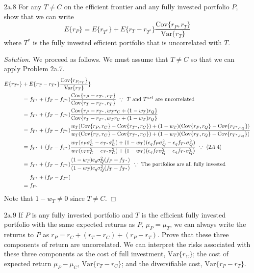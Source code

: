 \begin{problem}{2a.8}
For any $T \neq C$ on the efficient frontier and any fully invested portfolio $P$, show that we can write \[E\{r_{P}\} = E\{r_{T^{\ast}}\} + E\{r_{T} - r_{T^{\ast}}\}\frac{\mathrm{Cov}\{r_{P}, r_{T}\}}{\mathrm{Var}\{r_{T}\}}\] where $T^{\ast}$ is the fully invested efficient portfolio that is uncorrelated with $T$.
\end{problem}

\begin{proof}[Solution]
We proceed as follows. We must assume that $T \neq C$ so that we can apply Problem 2a.7.
\begin{align*}
E\{r_{T^{\ast}}\} &+ E\{r_{T} - r_{T^{\ast}}\}\frac{\mathrm{Cov}\{r_{P, r_{T}}\}}{\mathrm{Var}\{r_{T}\}}\}\\
&= f_{T^{\ast}} + (f_{T} - f_{T^{\ast}})\frac{\mathrm{Cov}\{r_{P} - r_{T^{\ast}}, r_{T}\}}{\mathrm{Cov}\{r_{T} - r_{T^{\ast}}, r_{T}\}} ~ \because ~ T \text{ and } T^{ast} \text{ are uncorrelated}\\
&= f_{T^{\ast}} + (f_{T} - f_{T^{\ast}})\frac{\mathrm{Cov}\{r_{P} - r_{T^{\ast}}, w_{T}r_{C} + (1 - w_{T})r_{Q}\}}{\mathrm{Cov}\{r_{T} - r_{T^{\ast}}, w_{T}r_{C} + (1 - w_{T})r_{Q}\}} \\
&= f_{T^{\ast}} + (f_{T} - f_{T^{\ast}})\frac{w_{T}(\mathrm{Cov}\{r_{P}, r_{C}\} - \mathrm{Cov}\{r_{T^{\ast}}, r_{C}\}) + (1 - w_{T})(\mathrm{Cov}\{r_{P}, r_{Q}\} - \mathrm{Cov}\{r_{T^{\ast}, r_{Q}}\})}{w_{T}(\mathrm{Cov}\{r_{T}, r_{C}\} - \mathrm{Cov}\{r_{T^{\ast}}, r_{C}\}) + (1 - w_{T})(\mathrm{Cov}\{r_{T}, r_{Q}\} - \mathrm{Cov}\{r_{T^{\ast}, r_{Q}}\})}\\
&= f_{T^{\ast}} + (f_{T} - f_{T^{\ast}})\frac{w_{T}(e_{P}\sigma_{C}^{2} - e_{T^{\ast}}\sigma_{C}^{2}) + (1 - w_{T})(e_{q}f_{P}\sigma_{Q}^{2} - e_{q}f_{T^{\ast}}\sigma_{Q}^{2})}{w_{T}(e_{T}\sigma_{C}^{2} - e_{T^{\ast}}\sigma_{C}^{2}) + (1 - w_{T})(e_{q}f_{T}\sigma_{Q}^{2} - e_{q}f_{T^{\ast}}\sigma_{Q}^{2})} ~ \because ~ (2A.4)\\
&= f_{T^{\ast}} + (f_{T} - f_{T^{\ast}})\frac{(1 - w_{T})e_{q}\sigma_{Q}^{2}(f_{P} - f_{T^{\ast}})}{(1 - w_{T})e_{q}\sigma_{Q}^{2}(f_{T} - f_{T^{\ast}})} ~ \because ~ \text{The portfolios are all fully invested}\\
&= f_{T^{\ast}} + (f_{P} - f_{T^{\ast}})\\
&= f_{P}.
\end{align*}
Note that $1 - w_{T} \neq 0$ since $T \neq C$.
\end{proof}


\begin{problem}{2a.9}
If $P$ is any fully invested portfolio and $T$ is the efficient fully invested portfolio with the same expected returns as $P$, $\mu_{P} = \mu_{T}$, we can always write the returns to $P$ as $r_{P} = r_{C} + (r_{T} - r_{C}) + (r_{P} - r_{T})$. Prove that these three components of return are uncorrelated. We can interpret the risks associated with these three components as the cost of full investment, $\mathrm{Var}\{r_{C}\}$; the cost of expected return $\mu_{P} - \mu_{C}$, $\mathrm{Var}\{r_{T} - r_{C}\}$; and the diversifiable cost, $\mathrm{Var}\{r_{P} - r_{T}\}$.
\end{problem}

